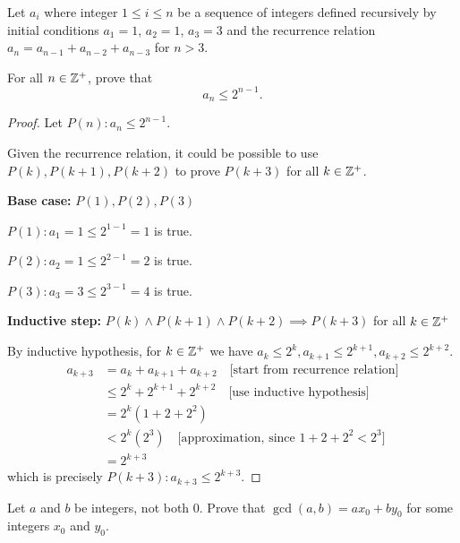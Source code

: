 \begin{prbm}
Let $a_i$ where integer $1\le i\le n$ be a sequence of integers defined recursively by initial conditions $a_1=1$, $a_2=1$, $a_3=3$ and the recurrence relation $a_n=a_{n-1}+a_{n-2}+a_{n-3}$ for $n>3$.

For all $n\in\mathbb Z^+$, prove that
\[ a_n\le2^{n-1}. \]
\end{prbm}

\begin{proof}
Let $P(n):a_n\le2^{n-1}$.

Given the recurrence relation, it could be possible to use $P(k),P(k+1),P(k+2)$ to prove $P(k+3)$ for all $k\in\mathbb Z^+$.

\textbf{Base case:} $P(1),P(2),P(3)$

$P(1):a_1=1\le2^{1-1}=1$ is true.

$P(2):a_2=1\le2^{2-1}=2$ is true.

$P(3):a_3=3\le2^{3-1}=4$ is true.

\textbf{Inductive step:} $P(k)\land P(k+1)\land P(k+2)\implies P(k+3)$ for all $k\in\mathbb Z^+$

By inductive hypothesis, for $k\in\mathbb Z^+$ we have $a_k\le2^k, a_{k+1}\le2^{k+1}, a_{k+2}\le2^{k+2}$.
\begin{align*}
a_{k+3} &= a_k+a_{k+1}+a_{k+2} \quad \text{[start from recurrence relation]} \\
&\le 2^k+2^{k+1}+2^{k+2} \quad \text{[use inductive hypothesis]} \\
&= 2^k(1+2+2^2) \\
&< 2^k(2^3) \quad \text{[approximation, since $1+2+2^2<2^3$]} \\
&= 2^{k+3}
\end{align*}
which is precisely $P(k+3):a_{k+3}\le2^{k+3}$.
\end{proof}
\pagebreak

\begin{prbm}
Let $a$ and $b$ be integers, not both $0$. Prove that $\gcd(a,b)=ax_0+by_0$ for some integers $x_0$ and $y_0$.
\end{prbm}

